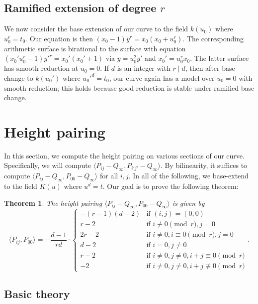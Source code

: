 \documentclass[reqno]{amsart}
\newtheorem{theorem}{Theorem}[section]
\theoremstyle{definition}
\theoremstyle{remark}
\newcommand{\sy}{\bar{y}}
\begin{document}
\subsection{Ramified extension of degree $r$}
\label{sec:ramif-extens-degr}

We now consider the base extension of our curve to the field $k(u_0)$ where $u_0^r = t_0$. Our equation is then $(x_0 - 1)\sy^r = x_0(x_0 + u_0^r)$. The corresponding arithmetic surface is birational to the surface with equation $(x_0'u_0^r - 1)\sy'^r = x_0'(x_0' + 1)$ via $\sy = u_0^2 \sy'$ and $x_0' = u_0^r x_0$. The latter surface has smooth reduction at $u_0 = 0$. If $d$ is an integer with $r \mid d$, then after base change to $k(u_0')$ where $u_0'^d = t_0$, our curve again has a model over $u_0 = 0$ with smooth reduction; this holds because good reduction is stable under ramified base change. 

\section{Height pairing}
\label{sec:height-pairing}

In this section, we compute the height pairing on various sections of our curve. Specifically, we will compute $\langle P_{ij} - Q_\infty, P_{i' j'} - Q_\infty \rangle$. By bilinearity, it suffices to compute $\langle P_{ij} - Q_\infty, P_{00} - Q_\infty \rangle$ for all $i,j$. In all of the following, we base-extend to the field $K(u)$ where $u^d = t$. Our goal is to prove the following theorem:

\begin{theorem}\label{thm:height-pairing}
  The height pairing $\langle P_{ij} - Q_\infty, P_{00} - Q_\infty\rangle$ is given by
  \[
  \langle P_{ij}, P_{00}\rangle = -\frac{d-1}{rd} \cdot
  \begin{cases}
    -(r-1)(d-2) & \text{if } (i,j) = (0,0) \\
    r-2 & \text{if } i\not\equiv 0 \pmod{r}, j = 0 \\
    2r-2 & \text{if } i\neq 0, i \equiv 0 \pmod{r}, j = 0 \\
    d - 2 & \text{if } i = 0, j \neq 0 \\
    r - 2 & \text{if } i \neq 0, j \neq 0, i+j \equiv 0 \pmod{r} \\
    -2 & \text{if } i \neq 0, j \neq 0, i+j \not\equiv 0 \pmod{r}
  \end{cases}.
  \]
\end{theorem}

\subsection{Basic theory}
\label{sec:basic-theory}
\end{document}
